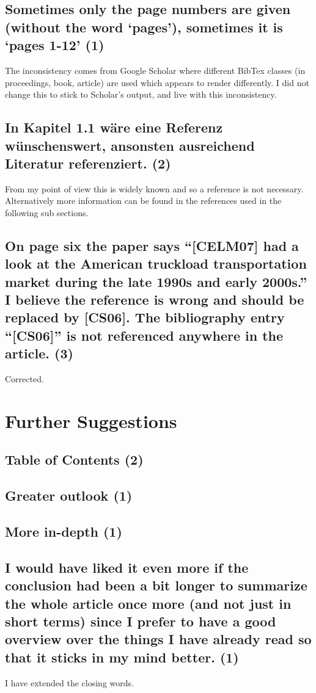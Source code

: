 \documentclass{"../../Datenanalyse/assignments/latex-brookesassignment/brookes-assignment"}
\begin{document}
\subsection{Sometimes only the page numbers are given (without the word `pages'), sometimes it is `pages 1-12' (1)}
The inconsistency comes from Google Scholar where different BibTex classes (in proceedings, book, article) are used which appears to render differently. I did not change this to stick to Scholar's output, and live with this inconsistency.
\subsection{In Kapitel 1.1 wäre eine Referenz wünschenswert, ansonsten ausreichend Literatur referenziert. (2)}
From my point of view this is widely known and so a reference is not necessary. Alternatively more information can be found in the references used in the following sub sections.
\subsection{On page six the paper says ``[CELM07] had a look at the American truckload transportation market during the late 1990s and early 2000s.'' I believe the reference is wrong and should be replaced by [CS06]. The bibliography entry ``[CS06]'' is not referenced anywhere in the article. (3)}
Corrected.

\section{Further Suggestions}
\subsection{Table of Contents (2)}
\subsection{Greater outlook (1)}
\subsection{More in-depth (1)}
\subsection{I would have liked it even more if the conclusion had been a bit longer to summarize the whole article once more (and not just in short terms) since I prefer to have a good overview over the things I have already read so that it sticks in my mind better. (1)}
I have extended the closing words.
\end{document}
